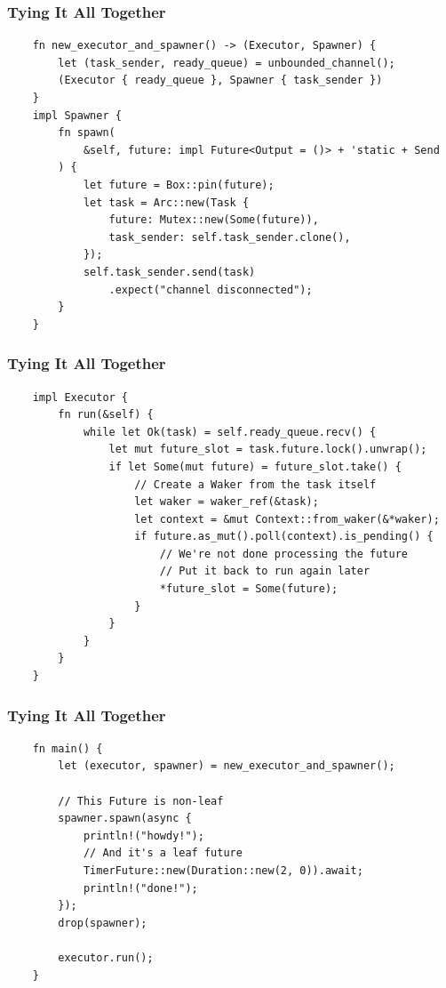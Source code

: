 \documentclass[aspectratio=1610,t]{beamer}
\begin{document}

\begin{frame}[fragile]
\frametitle{Tying It All Together}

\begin{verbatim}
    fn new_executor_and_spawner() -> (Executor, Spawner) {
        let (task_sender, ready_queue) = unbounded_channel();
        (Executor { ready_queue }, Spawner { task_sender })
    }
    impl Spawner {
        fn spawn(
            &self, future: impl Future<Output = ()> + 'static + Send
        ) {
            let future = Box::pin(future);
            let task = Arc::new(Task {
                future: Mutex::new(Some(future)),
                task_sender: self.task_sender.clone(),
            });
            self.task_sender.send(task)
                .expect("channel disconnected");
        }
    }
\end{verbatim}
\end{frame}


\begin{frame}[fragile]
\frametitle{Tying It All Together}
\begin{verbatim}
    impl Executor {
        fn run(&self) {
            while let Ok(task) = self.ready_queue.recv() {
                let mut future_slot = task.future.lock().unwrap();
                if let Some(mut future) = future_slot.take() {
                    // Create a Waker from the task itself
                    let waker = waker_ref(&task);
                    let context = &mut Context::from_waker(&*waker);
                    if future.as_mut().poll(context).is_pending() {
                        // We're not done processing the future
                        // Put it back to run again later
                        *future_slot = Some(future);
                    }
                }
            }
        }
    }
\end{verbatim}
\end{frame}


\begin{frame}[fragile]
\frametitle{Tying It All Together}
\begin{verbatim}
    fn main() {
        let (executor, spawner) = new_executor_and_spawner();

        // This Future is non-leaf
        spawner.spawn(async {
            println!("howdy!");
            // And it's a leaf future
            TimerFuture::new(Duration::new(2, 0)).await;
            println!("done!");
        });
        drop(spawner);

        executor.run();
    }
\end{verbatim}
\end{frame}
\end{document}
